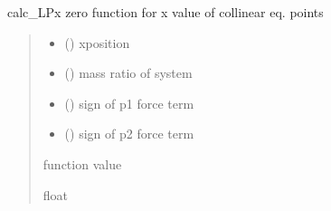 \documentclass[letterpaper,10pt,english]{sphinxmanual}
\begin{document}
\begin{fulllineitems}
\label{\detokenize{models:pyraa.models.LPx_func}}
\pysigstartsignatures
{}
\pysigstopsignatures
\sphinxAtStartPar
calc\_LPx \sphinxhyphen{} zero function for x value of collinear eq. points
\begin{quote}\begin{description}
\begin{itemize}
\item {} 
\sphinxAtStartPar
{} () \sphinxhyphen{}\sphinxhyphen{} x\sphinxhyphen{}position

\item {} 
\sphinxAtStartPar
{} () \sphinxhyphen{}\sphinxhyphen{} mass ratio of system

\item {} 
\sphinxAtStartPar
{} () \sphinxhyphen{}\sphinxhyphen{} sign of p1 force term

\item {} 
\sphinxAtStartPar
{} () \sphinxhyphen{}\sphinxhyphen{} sign of p2 force term

\end{itemize}

\sphinxAtStartPar
{} \sphinxhyphen{}\sphinxhyphen{} function value

\sphinxAtStartPar
float

\end{description}\end{quote}

\end{fulllineitems}

\end{document}
